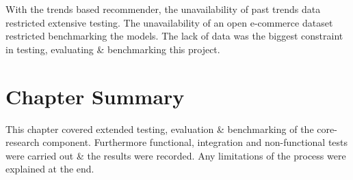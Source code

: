 With the trends based recommender, the unavailability of past trends data restricted extensive testing. The unavailability of an open e-commerce dataset restricted benchmarking the models. The lack of data was the biggest constraint in testing, evaluating \& benchmarking this project.

\section{Chapter Summary}
This chapter covered extended testing, evaluation \& benchmarking of the core-research component. Furthermore functional, integration and non-functional tests were carried out \& the results were recorded. Any limitations of the process were explained at the end.